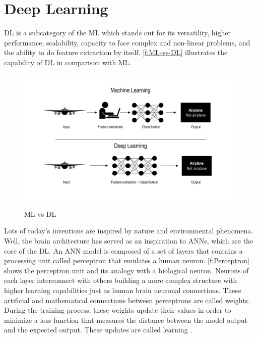 \section{Deep Learning}
\label{s:Second-Background-Deep-Learning}

\ac{DL} is a subcategory of the \ac{ML} which stands out for its versatility, higher performance, scalability, capacity to face complex and non-linear problems, and the ability to do feature extraction by itself. \autoref{f:ML-vs-DL} illustrates the capability of \ac{DL} in comparison with \ac{ML}. 

\begin{figure}[h]
\centering
\includegraphics[width=\linewidth]{figures/Ch2/MLvsDL.png}
\caption{ML vs DL}
\label{f:ML-vs-DL}
\end{figure}

Lots of today's inventions are inspired by nature and environmental phenomena. Well, the brain architecture has served as an inspiration to \ac{ANN}s, which are the core of the \ac{DL}. An \ac{ANN} model is composed of a set of layers that contains a processing unit called perceptron that emulates a human neuron. \autoref{f:Perceptron} shows the perceptron unit and its analogy with a biological neuron. Neurons of each layer interconnect with others building a more complex structure with higher learning capabilities just as human brain neuronal connections. These artificial and mathematical connections between perceptrons are called weights. During the training process, these weights update their values in order to minimize a loss function that measures the distance between the model output and the expected output. These updates are called learning \cite{Chollet2018}. 

